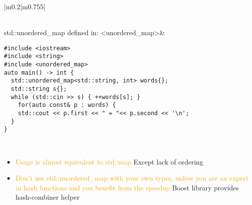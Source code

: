 \documentclass[main.tex,fontsize=8pt,paper=a4,paper=portrait,DIV=calc,]{scrartcl}
\begin{document}
\begin{table}[ht!]
\begin{tabular}{|m{0.2\linewidth}|m{0.755\linewidth}|}
\begin{itemize}
\end{itemize} \\
\hline
std::unordered\_map \newline
defined in: <unordered\_map>& 
\begin{lstlisting}
#include <iostream>
#include <string>
#include <unordered_map>
auto main() -> int {
  std::unordered_map<std::string, int> words{};
  std::string s{};
  while (std::cin >> s) { ++words[s]; }
    for(auto const& p : words) {
    std::cout << p.first << " = "<< p.second << '\n';
  }
}
\end{lstlisting}
\, \newline
\begin{itemize}
\item \textcolor{orange}{Usage is almost equivalent to std::map}\newline
  Except lack of ordering
\item \textcolor{orange}{Don't use std::unordered\_map with your own types, unless you are an expert in hash functions and you benefit from the speedup}\newline
  Boost library provides hash-combiner helper
\vspace{-2mm}
\end{itemize} \\
\hline
\end{tabular}

\end{table}
\end{document}
